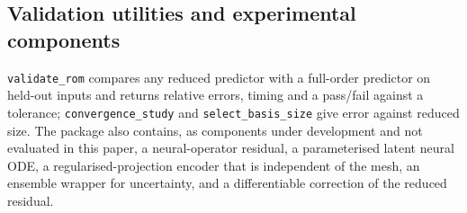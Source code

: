 \subsection{Validation utilities and experimental components}
\texttt{validate\_rom} compares any reduced predictor with a full-order predictor on held-out inputs and returns relative errors, timing and a pass/fail against a tolerance; \texttt{convergence\_study} and \texttt{select\_basis\_size} give error against reduced size.
The package also contains, as components under development and not evaluated in this paper, a neural-operator residual, a parameterised latent neural ODE, a regularised-projection encoder that is independent of the mesh, an ensemble wrapper for uncertainty, and a differentiable correction of the reduced residual.
